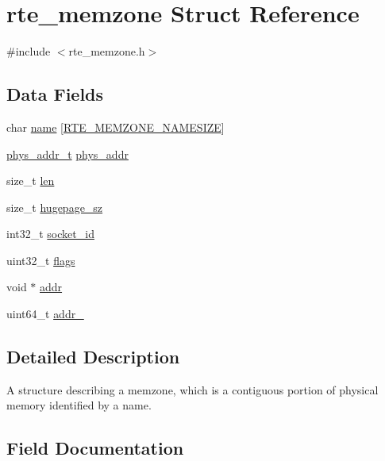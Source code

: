 \hypertarget{structrte__memzone}{}\section{rte\+\_\+memzone Struct Reference}
\label{structrte__memzone}


{\ttfamily \#include $<$rte\+\_\+memzone.\+h$>$}

\subsection*{Data Fields}
\begin{DoxyCompactItemize}
\item 
char \hyperlink{structrte__memzone_a1a1c0270e433d8ce66b34d3bd7c713fd}{name} \mbox{[}\hyperlink{rte__memzone_8h_a5621a1253a3875b601cdc533b3180240}{R\+T\+E\+\_\+\+M\+E\+M\+Z\+O\+N\+E\+\_\+\+N\+A\+M\+E\+S\+I\+Z\+E}\mbox{]}
\item 
\hyperlink{rte__memory_8h_aeed7e715f3dcfddef6f34dec94037646}{phys\+\_\+addr\+\_\+t} \hyperlink{structrte__memzone_a3901f538726d14b9ad14e0bd7578c959}{phys\+\_\+addr}
\item 
size\+\_\+t \hyperlink{structrte__memzone_a7360b55975153b822efc5217b7734e6a}{len}
\item 
size\+\_\+t \hyperlink{structrte__memzone_a0e9113d25bb493add104f3b95844aaf5}{hugepage\+\_\+sz}
\item 
int32\+\_\+t \hyperlink{structrte__memzone_ac24d1064025151de66984ed53d5d9373}{socket\+\_\+id}
\item 
uint32\+\_\+t \hyperlink{structrte__memzone_a773b39d480759f67926cb18ae2219281}{flags}
\item 
void $\ast$ \hyperlink{structrte__memzone_ae5bd6c22dbf0f6b5b0ae0233f8eb3704}{addr}
\item 
uint64\+\_\+t \hyperlink{structrte__memzone_a684abacaaf679b13b2ccec687a763b17}{addr\+\_}
\end{DoxyCompactItemize}


\subsection{Detailed Description}
A structure describing a memzone, which is a contiguous portion of physical memory identified by a name. 

\subsection{Field Documentation}
\hypertarget{structrte__memzone_ae5bd6c22dbf0f6b5b0ae0233f8eb3704}{}
